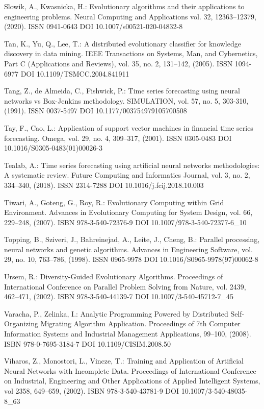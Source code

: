 \begin{thebibliography}{99.}
 Slowik, A., Kwasnicka, H.: Evolutionary algorithms and their applications to engineering problems. Neural Computing and Applications vol. 32, 12363--12379, (2020). ISSN 0941-0643 DOI 10.1007/s00521-020-04832-8

 Tan, K., Yu, Q., Lee, T.: A distributed evolutionary classifier for knowledge discovery in data mining. IEEE Transactions on Systems, Man, and Cybernetics, Part C (Applications and Reviews), vol. 35, no. 2, 131--142, (2005). ISSN 1094-6977 DOI 10.1109/TSMCC.2004.841911

 Tang, Z., de Almeida, C., Fishwick, P.: Time series forecasting using neural networks vs Box-Jenkins methodology. SIMULATION, vol. 57, no. 5, 303-310, (1991). ISSN 0037-5497 DOI 10.1177/003754979105700508

 Tay, F., Cao, L.: Application of support vector machines in financial time series forecasting. Omega, vol. 29, no. 4, 309--317, (2001). ISSN 0305-0483 DOI 10.1016/S0305-0483(01)00026-3

 Tealab, A.: Time series forecasting using artificial neural networks methodologies: A systematic review. Future Computing and Informatics Journal, vol. 3, no. 2, 334--340, (2018). ISSN 2314-7288 DOI 10.1016/j.fcij.2018.10.003

 Tiwari, A., Goteng, G., Roy, R.: Evolutionary Computing within Grid Environment. Advances in Evolutionary Computing for System Design, vol. 66, 229--248, (2007). ISBN 978-3-540-72376-9 DOI 10.1007/978-3-540-72377-6\_10

 Topping, B., Sziveri, J., Bahreinejad, A., Leite, J., Cheng, B.: Parallel processing, neural networks and genetic algorithms. Advances in Engineering Software, vol. 29, no. 10, 763--786, (1998). ISSN 0965-9978 DOI 10.1016/S0965-9978(97)00062-8

 Ursem, R.: Diversity-Guided Evolutionary Algorithms. Proceedings of International Conference on Parallel Problem Solving from Nature, vol. 2439, 462--471, (2002). ISBN 978-3-540-44139-7 DOI 10.1007/3-540-45712-7\_45

 Varacha, P., Zelinka, I.: Analytic Programming Powered by Distributed Self-Organizing Migrating Algorithm Application. Proceedings of 7th Computer Information Systems and Industrial Management Applications, 99--100, (2008). ISBN 978-0-7695-3184-7 DOI 10.1109/CISIM.2008.50

 Viharos, Z., Monostori, L., Vincze, T.: Training and Application of Artificial Neural Networks with Incomplete Data. Proceedings of International Conference on Industrial, Engineering and Other Applications of Applied Intelligent Systems, vol 2358, 649--659, (2002). ISBN 978-3-540-43781-9 DOI 10.1007/3-540-48035-8\_63


\end{thebibliography}
